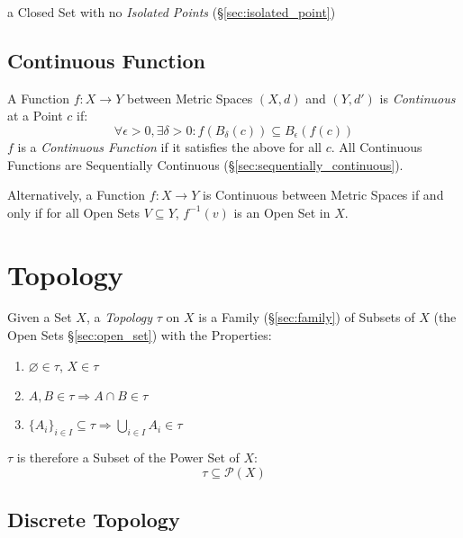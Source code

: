 a Closed Set with no \emph{Isolated Points}
(\S\ref{sec:isolated_point})



\subsection{Continuous Function}\label{sec:continuous_function}

A Function $f : X \rightarrow Y$ between Metric Spaces $(X,d)$ and
$(Y,d')$ is \emph{Continuous} at a Point $c$ if:
\[
  \forall \epsilon > 0, \exists \delta > 0 :
  f (B_{\delta}(c)) \subseteq B_{\epsilon}(f(c))
\]
$f$ is a \emph{Continuous Function} if it satisfies the above for all
$c$. All Continuous Functions are Sequentially Continuous
(\S\ref{sec:sequentially_continuous}).

Alternatively, a Function $f: X \rightarrow Y$ is Continuous between
Metric Spaces if and only if for all Open Sets $V \subseteq Y$,
$f^{-1}(v)$ is an Open Set in $X$.



\section{Topology}\label{sec:topology}

Given a Set $X$, a \emph{Topology} $\tau$ on $X$ is a Family
(\S\ref{sec:family}) of Subsets of $X$ (the Open Sets
\S\ref{sec:open_set}) with the Properties:
\begin{enumerate}
  \item $\varnothing \in \tau$, $X \in \tau$
  \item $A,B \in \tau \Rightarrow A \cap B \in \tau$
  \item $\{A_i\}_{i \in I} \subseteq \tau \Rightarrow \bigcup_{i \in
  I} A_i \in \tau$
\end{enumerate}
$\tau$ is therefore a Subset of the Power Set of $X$:
\[
  \tau \subseteq \mathcal{P}(X)
\]



\subsection{Discrete Topology}\label{sec:discrete_topology}

